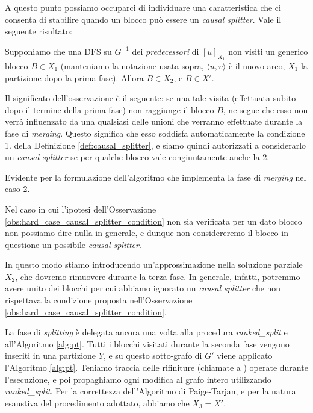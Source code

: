 A questo punto possiamo occuparci di individuare una caratteristica che ci consenta di stabilire quando un blocco può essere un \emph{causal splitter}. Vale il seguente risultato:

\begin{observation}
    \label{obs:hard_case_causal_splitter_condition}
    Supponiamo che una DFS su $G^{-1}$ dei \emph{predecessori} di $[u]_{X_1}$ non visiti un generico blocco $B \in X_1$ (manteniamo la notazione usata sopra, $\langle u,v \rangle$ è il nuovo arco, $X_1$ la partizione dopo la prima fase). Allora $B \in X_2$, e $B \in X'$.
\end{observation}

Il significato dell'osservazione è il seguente: se una tale visita (effettuata subito dopo il termine della prima fase) non raggiunge il blocco $B$, ne segue che esso non verrà influenzato da una qualsiasi delle unioni che verranno effettuate durante la fase di \emph{merging}. Questo significa che esso soddisfa automaticamente la condizione 1. della Definizione \ref{def:causal_splitter}, e siamo quindi autorizzati a considerarlo un \emph{causal splitter} se per qualche blocco vale congiuntamente anche la 2.

\begin{proof2}
    Evidente per la formulazione dell'algoritmo che implementa la fase di \emph{merging} nel caso 2.
\end{proof2}

Nel caso in cui l'ipotesi dell'Osservazione \ref{obs:hard_case_causal_splitter_condition} non sia verificata per un dato blocco non possiamo dire nulla in generale, e dunque non considereremo il blocco in questione un possibile \emph{causal splitter}.

In questo modo stiamo introducendo un'approssimazione nella soluzione parziale $X_2$, che dovremo rimuovere durante la terza fase. In generale, infatti, potremmo avere unito dei blocchi per cui abbiamo ignorato un \emph{causal splitter} che non rispettava la condizione proposta nell'Osservazione \ref{obs:hard_case_causal_splitter_condition}.

La fase di \emph{splitting} è delegata ancora una volta alla procedura \emph{ranked\_split} e all'Algoritmo \ref{alg:pt}. Tutti i blocchi visitati durante la seconda fase vengono inseriti in una partizione $Y$, e su questo sotto-grafo di $G'$ viene applicato l'Algoritmo \ref{alg:pt}. Teniamo traccia delle rifiniture (chiamate a \splitfunc) operate durante l'esecuzione, e poi propaghiamo ogni modifica al grafo intero utilizzando \emph{ranked\_split}. Per la correttezza dell'Algoritmo di Paige-Tarjan, e per la natura esaustiva del procedimento adottato, abbiamo che $X_3 = X'$.

